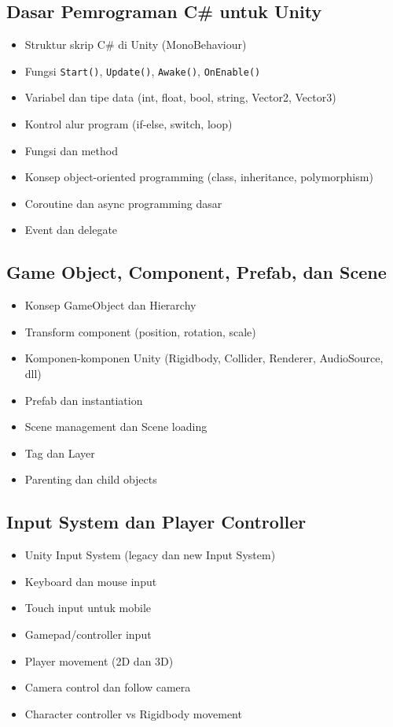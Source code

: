 \documentclass[a4paper,12pt]{article}
\begin{document}
\subsection{Dasar Pemrograman C\# untuk Unity}
\begin{itemize}
\item Struktur skrip C\# di Unity (MonoBehaviour)
\item Fungsi \texttt{Start()}, \texttt{Update()}, \texttt{Awake()}, \texttt{OnEnable()}
\item Variabel dan tipe data (int, float, bool, string, Vector2, Vector3)
\item Kontrol alur program (if-else, switch, loop)
\item Fungsi dan method
\item Konsep object-oriented programming (class, inheritance, polymorphism)
\item Coroutine dan async programming dasar
\item Event dan delegate
\end{itemize}

\subsection{Game Object, Component, Prefab, dan Scene}
\begin{itemize}
\item Konsep GameObject dan Hierarchy
\item Transform component (position, rotation, scale)
\item Komponen-komponen Unity (Rigidbody, Collider, Renderer, AudioSource, dll)
\item Prefab dan instantiation
\item Scene management dan Scene loading
\item Tag dan Layer
\item Parenting dan child objects
\end{itemize}

\subsection{Input System dan Player Controller}
\begin{itemize}
\item Unity Input System (legacy dan new Input System)
\item Keyboard dan mouse input
\item Touch input untuk mobile
\item Gamepad/controller input
\item Player movement (2D dan 3D)
\item Camera control dan follow camera
\item Character controller vs Rigidbody movement
\end{itemize}
\end{document}
